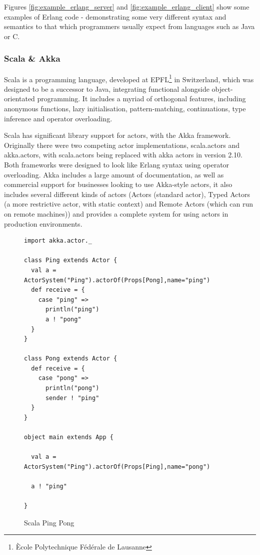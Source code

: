 \documentclass[pdftex,12pt,a4paper]{article}
\begin{document}
Figures \ref{fig:example_erlang_server} and \ref{fig:example_erlang_client} show some examples of Erlang code - demonstrating some very different syntax and semantics to that which programmers usually expect from languages such as Java or C.

\subsubsection{Scala \& Akka}

Scala is a programming language, developed at EPFL\footnote{\`{E}cole Polytechnique F\'{e}d\'{e}rale de Lausanne} in Switzerland, which was designed to be a successor to Java, integrating functional alongside object-orientated programming.
It includes a myriad of orthogonal features, including anonymous functions, lazy initialisation, pattern-matching, continuations, type inference and operator overloading.

Scala has significant library support for actors, with the Akka framework.
Originally there were two competing actor implementations, scala.actors and akka.actors, with scala.actors being replaced with akka actors in version 2.10\cite{scala-actor-migration}.
Both frameworks were designed to look like Erlang syntax using operator overloading.
Akka includes a large amount of documentation, as well as commercial support for businesses looking to use Akka-style actors, it also includes several different kinds of actors (Actors (standard actor), Typed Actors (a more restrictive actor, with static context) and Remote Actors (which can run on remote machines)) and provides a complete system for using actors in production environments.

\begin{figure}[H]
\begin{verbatim}
import akka.actor._

class Ping extends Actor {
  val a = ActorSystem("Ping").actorOf(Props[Pong],name="ping")
  def receive = {
    case "ping" =>
      println("ping")
      a ! "pong"
  }
}

class Pong extends Actor {
  def receive = {
    case "pong" =>
      println("pong")
      sender ! "ping"
  }
}

object main extends App {

  val a = ActorSystem("Ping").actorOf(Props[Ping],name="pong")

  a ! "ping"

}
\end{verbatim}
\caption{Scala Ping Pong}
\label{fig:scala-ping-pong}
\end{figure}
\end{document}
